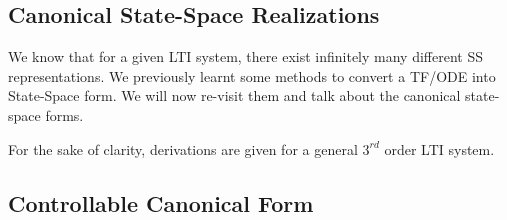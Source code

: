 \documentclass[twoside]{article}
\begin{document}
\subsection{Canonical State-Space Realizations}

We know  that for a given LTI system, there exist infinitely many 
different SS representations. We previously learnt some methods 
to convert  a TF/ODE into State-Space form. We will now re-visit
them and talk about the canonical state-space forms.

For the sake of clarity, derivations are given for a general $3^{rd}$ order LTI system.

\subsection{Controllable Canonical Form}
\end{document}
